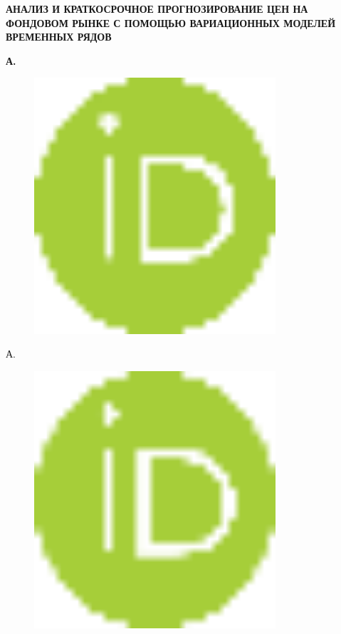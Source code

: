 
{\bfseries АНАЛИЗ И КРАТКОСРОЧНОЕ ПРОГНОЗИРОВАНИЕ ЦЕН НА ФОНДОВОМ РЫНКЕ С
ПОМОЩЬЮ ВАРИАЦИОННЫХ МОДЕЛЕЙ ВРЕМЕННЫХ РЯДОВ}

{\bfseries А.
\begin{figure}[H]
	\centering
	\includegraphics[width=0.8\textwidth]{media/ict2/image1}
	\caption*{}
\end{figure}

А.
\begin{figure}[H]
	\centering
	\includegraphics[width=0.8\textwidth]{media/ict2/image2}
	\caption*{}
\end{figure}

}
